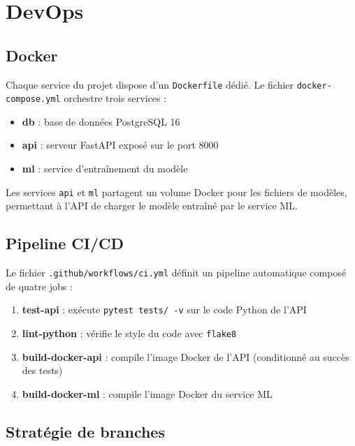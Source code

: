 \documentclass[12pt, a4paper]{article}
\begin{document}
\section{DevOps}

\subsection{Docker}

Chaque service du projet dispose d'un \texttt{Dockerfile} dédié. Le fichier \texttt{docker-compose.yml} orchestre trois services :

\begin{itemize}
    \item \textbf{db} : base de données PostgreSQL 16
    \item \textbf{api} : serveur FastAPI exposé sur le port 8000
    \item \textbf{ml} : service d'entraînement du modèle
\end{itemize}

Les services \texttt{api} et \texttt{ml} partagent un volume Docker pour les fichiers de modèles, permettant à l'API de charger le modèle entraîné par le service ML.

\subsection{Pipeline CI/CD}

Le fichier \texttt{.github/workflows/ci.yml} définit un pipeline automatique composé de quatre jobs :

\begin{enumerate}
    \item \textbf{test-api} : exécute \texttt{pytest tests/ -v} sur le code Python de l'API
    \item \textbf{lint-python} : vérifie le style du code avec \texttt{flake8}
    \item \textbf{build-docker-api} : compile l'image Docker de l'API (conditionné au succès des tests)
    \item \textbf{build-docker-ml} : compile l'image Docker du service ML
\end{enumerate}

\subsection{Stratégie de branches}
\end{document}
